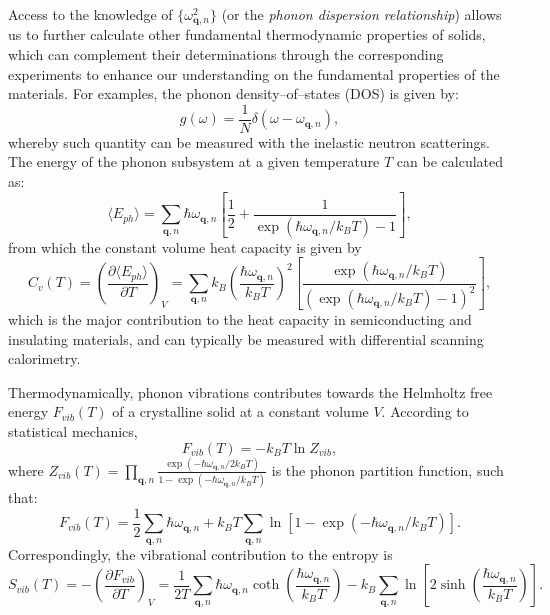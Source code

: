 Access to the knowledge of $\{\omega_{\bm{q},n}^2\}$ (or the \emph{phonon dispersion relationship}) allows us to further calculate other fundamental thermodynamic properties of solids,\cite{phonopy} which can complement their determinations through the corresponding experiments to enhance our understanding on the fundamental properties of the materials. For examples, the phonon density--of--states (DOS) is given by:
\begin{equation}\label{eq:ph_DOS}
    g(\omega)=\frac{1}{N}\delta\left(\omega-\omega_{\bm{q},n}\right),
\end{equation}
whereby such quantity can be  measured with the inelastic neutron scatterings.\cite{osborn2001phonon,cheng2019simulation} The energy of the phonon subsystem at a given temperature $T$ can be calculated as:
\begin{equation}\label{eq:total_E_ph}
    \langle E_{ph}\rangle=\sum_{\bm{q},n}\hbar\omega_{\bm{q},n}\left[\frac{1}{2}+\frac{1}{\exp(\hbar\omega_{\bm{q},n}/k_{B}T)-1}\right],
\end{equation}
from which the constant volume heat capacity is given by
\begin{equation}\label{eq:Cv}
    C_v (T)=\left(\frac{\partial \langle E_{ph}\rangle}{\partial T}\right)_V
    =\sum_{\bm{q},n}k_{B}\left(\frac{\hbar\omega_{\bm{q},n}}{k_{B}T}\right)^2\left[\frac{\exp(\hbar\omega_{\bm{q},n}/k_{B}T)}{(\exp(\hbar\omega_{\bm{q},n}/k_{B}T)-1)^2}\right],
\end{equation}
which is the major contribution to the heat capacity in semiconducting and insulating materials, and  can typically be measured with differential scanning calorimetry.  


Thermodynamically, phonon vibrations contributes towards the Helmholtz free energy $F_{vib}(T)$ of a crystalline solid at a constant volume $V$. According to statistical mechanics, 
\begin{equation}\label{eq:free_energy_statistical_mech}
    F_{vib}(T)=-k_{B}T\ln Z_{vib},
\end{equation}
where $Z_{vib}(T)=\prod_{\bm{q},n}\frac{\exp(-\hbar\omega_{\bm{q},n}/2k_{B}T)}{1-\exp(-\hbar\omega_{\bm{q},n}/k_{B}T)}$ is the phonon partition function, such that:\cite{phonopy}
\begin{equation}\label{eq:helmholtz}
F_{vib}(T)=\frac{1}{2}\sum_{\bm{q},n}\hbar\omega_{\bm{q},n}+k_{B}T\sum_{\bm{q},n}\ln\left[1-\exp(-\hbar\omega_{\bm{q},n}/k_{B}T)\right].
\end{equation}
Correspondingly, the vibrational contribution to the entropy is
\begin{equation}\label{eq:vib_entropy}
S_{vib}(T)=-\left(\frac{\partial F_{vib}}{\partial T}\right)_V=\frac{1}{2T}\sum_{\bm{q},n}\hbar\omega_{\bm{q},n}\coth\left(\frac{\hbar\omega_{\bm{q},n}}{k_{B}T}\right) - k_{B}\sum_{\bm{q},n}\ln\left[2\sinh\left(\frac{\hbar\omega_{\bm{q},n}}{k_{B}T}\right)\right].
\end{equation}

